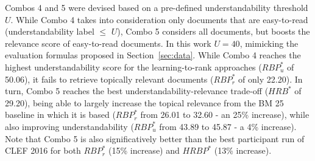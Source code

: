 Combos 4 and 5 were devised based on a pre-defined understandability threshold $U$. While Combo 4 takes into consideration only documents that are easy-to-read (understandability label $\le$ $U$), Combo 5 considers all documents, but boosts the relevance score of easy-to-read documents. In this work $U=40$, mimicking the evaluation formulas proposed in Section~\ref{sec:data}. While Combo 4 reaches the highest understandability score for the learning-to-rank approaches ($RBP_u^{*}$ of 50.06), it fails to retrieve topically relevant documents ($RBP_r^{*}$ of only 22.20). In turn, Combo 5 reaches the best understandability-relevance trade-off ($HRB^{*}$ of 29.20), being able to largely increase the topical relevance from the BM 25 baseline in which it is based ($RBP_r^*$ from 26.01 to 32.60 - an 25\% increase), while also improving understandability ($RBP_u^*$ from 43.89 to 45.87 - a 4\% increase). Note that Combo 5 is also significatively better than the best participant run of CLEF
2016 for both $RBP_r^{*}$ (15\% increase) and $HRBP^{*}$ (13\% increase).




